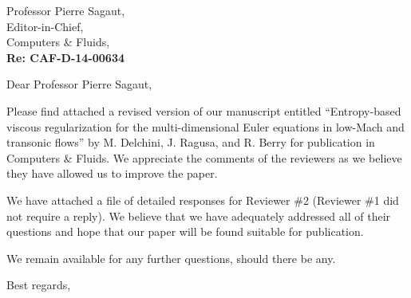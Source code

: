 \begin{letter}{Professor Pierre Sagaut, \\  Editor-in-Chief,\\
    Computers \& Fluids,\\
\textbf{Re: CAF-D-14-00634}}


\date{\today}

\opening{Dear Professor Pierre Sagaut,}
         \vspace{0.25cm}

Please find attached  a revised version of our manuscript entitled
``Entropy-based viscous regularization for the multi-dimensional Euler equations in low-Mach and transonic flows''
by M. Delchini, J. Ragusa, and R. Berry for
publication in Computers \& Fluids. We appreciate the comments of the reviewers as we
believe they have allowed us to improve the paper.

We have attached a file of detailed responses for Reviewer \#2 (Reviewer \#1 did not require a reply).
We believe that we have adequately addressed all of their questions and hope that our paper will be found suitable for publication.

%
%
\bigskip

We remain available for any further questions, should there be any.



\closing{Best regards, }

\end{letter}



